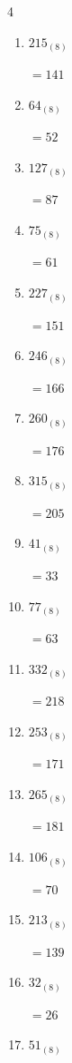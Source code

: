 \begin{multicols}{4}
\begin{enumerate}
  \item $215_{(8)}$

        $=141$

  \item $64_{(8)}$

        $=52$

  \item $127_{(8)}$

        $=87$

  \item $75_{(8)}$

        $=61$

  \item $227_{(8)}$

        $=151$

  \item $246_{(8)}$

        $=166$

  \item $260_{(8)}$

        $=176$

  \item $315_{(8)}$

        $=205$

  \item $41_{(8)}$

        $=33$

  \item $77_{(8)}$

        $=63$

  \item $332_{(8)}$

        $=218$

  \item $253_{(8)}$

        $=171$

\columnbreak %

  \item $265_{(8)}$

        $=181$

  \item $106_{(8)}$

        $=70$

  \item $213_{(8)}$

        $=139$

  \item $32_{(8)}$

        $=26$

  \item $51_{(8)}$


\end{enumerate}
\end{multicols}
